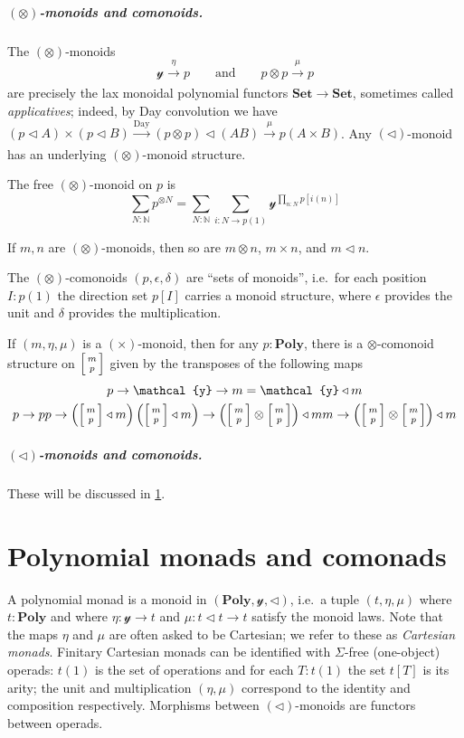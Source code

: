\documentclass[11pt, one side, article]{memoir}
\makeatletter
\theoremstyle{definition}
\theoremstyle{plain}
\newcommand{\Cat}[1]{\mathbf{#1}}%
\newcommand{\To}[2][]{\xrightarrow[#1]{#2}}
\newcommand{\nn}{\mathbb{N}}
\newcommand{\smset}{\Cat{Set}}
\newcommand{\yon}{\mathcal{y}}
\newcommand{\poly}{\Cat{Poly}}
\newcommand{\0}{\textsf{0}}
\newcommand{\1}{\tn{\textsf{1}}}
\newcommand{\tri}{\mathbin{\triangleleft}}
\newcommand{\biglens}[2]{
     \begin{bmatrix}{\vphantom{f_f^f}#2} \\ {\vphantom{f_f^f}#1} \end{bmatrix}
}
\newcommand{\littlelens}[2]{
     \begin{bsmallmatrix}{\vphantom{f}#2} \\ {\vphantom{f}#1} \end{bsmallmatrix}
}
\newcommand{\lens}[2]{
  \relax\if@display
     \biglens{#1}{#2}
  \else
     \littlelens{#1}{#2}
  \fi
}
\newcommand{\qqand}{\qquad\text{and}\qquad}
\makeatother
\begin{document}
\paragraph{$(\otimes)$-monoids and comonoids.}
The $(\otimes)$-monoids
\begin{equation}\label{eqn.otimes_monoids}
	\yon\To{\eta} p
	\qqand
	p\otimes p\To{\mu} p
\end{equation}
are precisely the lax monoidal polynomial functors $\smset\to\smset$, sometimes called \emph{applicatives}; indeed, by Day convolution we have $(p\tri A)\times (p\tri B)\To{\text{Day}} (p\otimes p)\tri(AB)\To{\mu}p(A\times B)$. Any $(\tri)$-monoid has an underlying $(\otimes)$-monoid structure.

The free $(\otimes)$-monoid on $p$ is
\begin{equation}
	\sum_{N:\nn}p^{\otimes N}=\sum_{N:\nn}\sum_{i\colon N\to p(1)}\yon^{\prod_{n:N}p[i(n)]}
\end{equation}

If $m,n$ are $(\otimes)$-monoids, then so are $m\otimes n$, $m\times n$, and $m\tri n$. 

The $(\otimes)$-comonoids $(p,\epsilon,\delta)$ are ``sets of monoids'', i.e.\ for each position $I:p(1)$ the direction set $p[I]$ carries a monoid structure, where $\epsilon$ provides the unit and $\delta$ provides the multiplication.

If $(m,\eta,\mu)$ is a $(\times)$-monoid, then for any $p:\poly$, there is a $\otimes$-comonoid structure on $\lens{p}{m}$ given by the transposes of the following maps
\begin{gather}
	p\to \yon\to m=\yon\tri m\\
	p\to pp\to\left(\lens{p}{m}\tri m\right)\left(\lens{p}{m}\tri m\right)\to\left(\lens{p}{m}\otimes\lens{p}{m}\right)\tri mm\to\left(\lens{p}{m}\otimes\lens{p}{m}\right)\tri m
\end{gather}


\paragraph{$(\tri)$-monoids and comonoids.} These will be discussed in \cref{chap.monad_comonad}.


\chapter{Polynomial monads and comonads}\label{chap.monad_comonad}

A polynomial monad is a monoid in $(\poly,\yon,\tri)$, i.e.\ a tuple $(t,\eta,\mu)$ where $t:\poly$ and where $\eta\colon\yon\to t$ and $\mu\colon t\tri t\to t$ satisfy the monoid laws. Note that the maps $\eta$ and $\mu$ are often asked to be Cartesian; we refer to these as \emph{Cartesian monads}. Finitary Cartesian monads can be identified with $\Sigma$-free (one-object) operads: $t(1)$ is the set of operations and for each $T:t(1)$ the set $t[T]$ is its arity; the unit and multiplication $(\eta,\mu)$ correspond to the identity and composition respectively. Morphisms between $(\tri)$-monoids are functors between operads.
\end{document}
